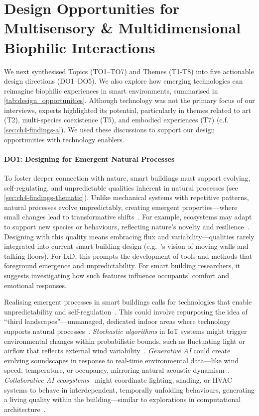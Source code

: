 \section{Design Opportunities for Multisensory \& Multidimensional Biophilic Interactions}
\label{sec:ch4-design-opportunities}
We next synthesised Topics (TO1–TO7) and Themes (T1-T8) into five actionable design directions (DO1–DO5). We also explore how emerging technologies can reimagine biophilic experiences in smart environments, summarised in \autoref{tab:design_opportunities}. Although technology was not the primary focus of our interviews, experts highlighted its potential, particularly in themes related to art (T2), multi-species coexistence (T5), and embodied experiences (T7) (c.f. \autoref{sec:ch4-findings-a}). We used these discussions to support our design opportunities with technology enablers.


\paragraph{DO1: Designing for Emergent Natural Processes}
To foster deeper connection with nature, smart buildings must support evolving, self-regulating, and unpredictable qualities inherent in natural processes (see \autoref{sec:ch4-findings-thematic}). Unlike mechanical systems with repetitive patterns, natural processes evolve unpredictably, creating emergent properties---where small changes lead to transformative shifts~\cite{clement2004manifeste}. For example, ecosystems may adapt to support new species or behaviours, reflecting nature’s novelty and resilience~\cite{carscadden2023origins, radeloff2015rise}. Designing with this quality means embracing flux and variability---qualities rarely integrated into current smart building design (e.g.~\citet{economidou2021moving}'s vision of moving walls and talking floors). For IxD, this prompts the development of tools and methods that foreground emergence and unpredictability. For smart building researchers, it suggests investigating how such features influence occupants' comfort and emotional responses.

Realising emergent processes in smart buildings calls for technologies that enable unpredictability and self-regulation~\cite{clement2004manifeste}. This could involve repurposing the idea of ``third landscapes''---unmanaged, dedicated indoor areas where technology supports natural processes~\cite{clement2004manifeste}. \emph{Stochastic algorithms} in IoT systems might trigger environmental changes within probabilistic bounds, such as fluctuating light or airflow that reflects external wind variability~\cite{karapetyan2019multisensor}. \emph{Generative AI} could create evolving soundscapes in response to real-time environmental data—like wind speed, temperature, or occupancy, mirroring natural acoustic dynamism~\cite{parati2024using, ble2023generative}. \emph{Collaborative AI ecosystems}~\cite{koch2017design} might coordinate lighting, shading, or HVAC systems to behave in interdependent, temporally unfolding behaviours, generating a living quality within the building---similar to explorations in computational architecture~\cite{weber2024designing}.


